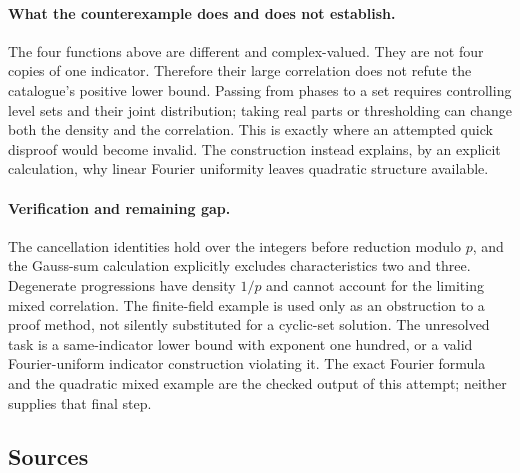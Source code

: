 \documentclass[11pt,a4paper]{article}
\begin{document}
\paragraph{What the counterexample does and does not establish.}
The four functions above are different and complex-valued. They are not four copies of one indicator. Therefore their large correlation does not refute the catalogue's positive lower bound. Passing from phases to a set requires controlling level sets and their joint distribution; taking real parts or thresholding can change both the density and the correlation. This is exactly where an attempted quick disproof would become invalid. The construction instead explains, by an explicit calculation, why linear Fourier uniformity leaves quadratic structure available.

\paragraph{Verification and remaining gap.}
The cancellation identities hold over the integers before reduction modulo $p$, and the Gauss-sum calculation explicitly excludes characteristics two and three. Degenerate progressions have density $1/p$ and cannot account for the limiting mixed correlation. The finite-field example is used only as an obstruction to a proof method, not silently substituted for a cyclic-set solution. The unresolved task is a same-indicator lower bound with exponent one hundred, or a valid Fourier-uniform indicator construction violating it. The exact Fourier formula and the quadratic mixed example are the checked output of this attempt; neither supplies that final step.

\subsection{Sources}
\end{document}
